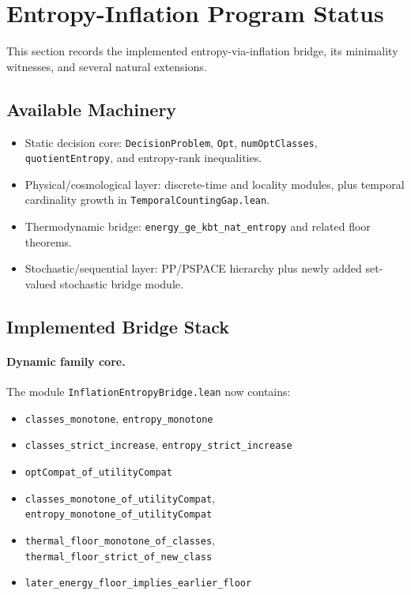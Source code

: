 \section{Entropy-Inflation Program Status}\label{sec:entropy-inflation-program}

This section records the implemented entropy-via-inflation bridge, its minimality witnesses, and several natural extensions.

\subsection{Available Machinery}

\begin{itemize}
\item Static decision core: \texttt{DecisionProblem}, \texttt{Opt}, \texttt{numOptClasses}, \texttt{quotientEntropy}, and entropy-rank inequalities.
\item Physical/cosmological layer: discrete-time and locality modules, plus temporal cardinality growth in \texttt{TemporalCountingGap.lean}.
\item Thermodynamic bridge: \texttt{energy\_ge\_kbt\_nat\_entropy} and related floor theorems.
\item Stochastic/sequential layer: PP/PSPACE hierarchy plus newly added set-valued stochastic bridge module.
\end{itemize}

\subsection{Implemented Bridge Stack}

\paragraph{Dynamic family core.}
The module \texttt{InflationEntropyBridge.lean} now contains:
\begin{itemize}
\item \texttt{classes\_monotone}, \texttt{entropy\_monotone}
\item \texttt{classes\_strict\_increase}, \texttt{entropy\_strict\_increase}
\item \texttt{optCompat\_of\_utilityCompat}
\item \texttt{classes\_monotone\_of\_utilityCompat}, \texttt{entropy\_monotone\_of\_utilityCompat}
\item \texttt{thermal\_floor\_monotone\_of\_classes}, \texttt{thermal\_floor\_strict\_of\_new\_class}
\item \texttt{later\_energy\_floor\_implies\_earlier\_floor}
\end{itemize}

